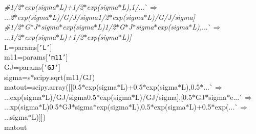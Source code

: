 {{\begin{tabbing}
{{}}\\
\\
{\it{\#\hspace{20pt}{[}\hspace{105pt}1/2$\ast$exp(sigma$\ast$L)+1/2$\ast$exp(\dash{}sigma$\ast$L),\hspace{5pt}1/}}{}...\`$\Rightarrow$\\
...{}{\it{2$\ast$exp(sigma$\ast$L)/G/J/sigma\dash{}1/2$\ast$exp(\dash{}sigma$\ast$L)/G/J/sigma{]}
}}\\
{\it{\#\hspace{20pt}{[}\hspace{5pt}1/2$\ast$G$\ast$J$\ast$sigma$\ast$exp(sigma$\ast$L)\dash{}1/2$\ast$G$\ast$J$\ast$sigma$\ast$exp(\dash{}sigma$\ast$L),\hspace{15pt}}}{}...\`$\Rightarrow$\\
...{}{\it{\hspace{90pt}1/2$\ast$exp(sigma$\ast$L)+1/2$\ast$exp(\dash{}sigma$\ast$L){]}
}}\\
\hspace{20pt}L=params{[}{\texttt{{'}L{'}}}{]}
\\
\hspace{20pt}m11=params{[}{\texttt{{'}m11{'}}}{]}
\\
\hspace{20pt}GJ=params{[}{\texttt{{'}GJ{'}}}{]}
\\
\hspace{20pt}sigma=s$\ast$scipy.sqrt(m11/GJ)
\\
\hspace{20pt}matout=scipy.array({[}{[}0.5$\ast$exp(sigma$\ast$L)+0.5$\ast$exp(\dash{}sigma$\ast$L),\hspace{5pt}0.5$\ast${}...\`$\Rightarrow$\\
...{}exp(sigma$\ast$L)/GJ/sigma\dash{}0.5$\ast$exp(\dash{}sigma$\ast$L)/GJ/sigma{]},{[}0.5$\ast$GJ$\ast$sigma$\ast$e{}...\`$\Rightarrow$\\
...{}xp(sigma$\ast$L)\dash{}0.5$\ast$GJ$\ast$sigma$\ast$exp(\dash{}sigma$\ast$L),0.5$\ast$exp(sigma$\ast$L)+0.5$\ast$exp(\dash{}{}...\`$\Rightarrow$\\
...{}sigma$\ast$L){]}{]})
\\
\hspace{5pt}matout
\\


\end{tabbing}}}
